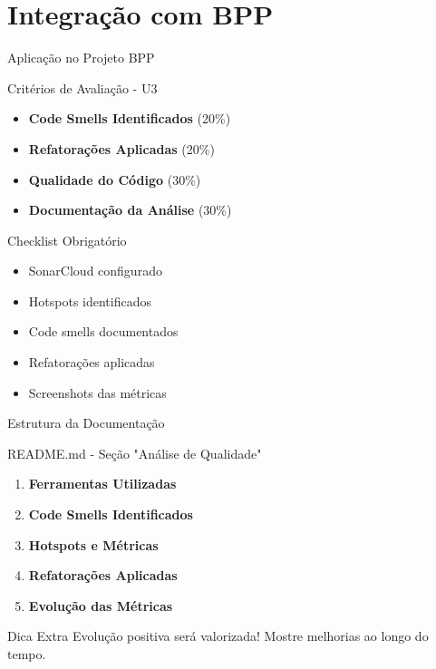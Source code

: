 \documentclass[aspectratio=169,11pt]{beamer}
\begin{document}
\section{Integração com BPP}

\begin{frame}{Aplicação no Projeto BPP}
\begin{block}{Critérios de Avaliação - U3}
\begin{itemize}
    \item \textbf{Code Smells Identificados} (20\%)
    \item \textbf{Refatorações Aplicadas} (20\%) 
    \item \textbf{Qualidade do Código} (30\%)
    \item \textbf{Documentação da Análise} (30\%)
\end{itemize}
\end{block}

\begin{exampleblock}{ Checklist Obrigatório}
\begin{itemize}
    \item SonarCloud configurado
    \item Hotspots identificados
    \item Code smells documentados
    \item Refatorações aplicadas
    \item Screenshots das métricas
\end{itemize}
\end{exampleblock}
\end{frame}

\begin{frame}{Estrutura da Documentação}
\begin{block}{README.md - Seção "Análise de Qualidade"}
\begin{enumerate}
    \item \textbf{Ferramentas Utilizadas}
    \item \textbf{Code Smells Identificados}
    \item \textbf{Hotspots e Métricas}
    \item \textbf{Refatorações Aplicadas}
    \item \textbf{Evolução das Métricas}
\end{enumerate}
\end{block}

\begin{alertblock}{ Dica Extra}
Evolução positiva será valorizada! Mostre melhorias ao longo do tempo.
\end{alertblock}
\end{frame}
\end{document}
